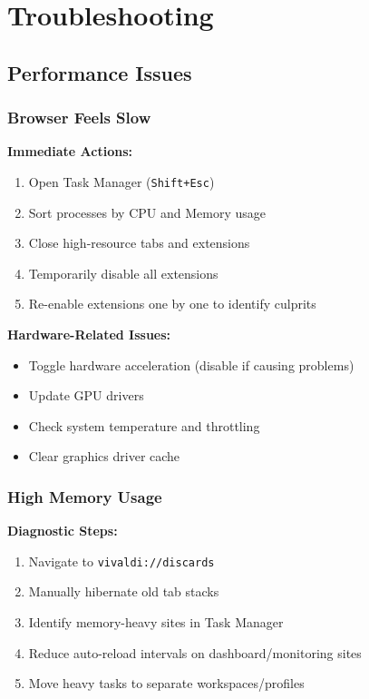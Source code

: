 \documentclass[11pt,a4paper,oneside]{book}
\newcommand{\keystroke}[1]{\texttt{\color{primaryblue}#1}}
\begin{document}
\chapter{Troubleshooting}

\section{Performance Issues}

\subsection{Browser Feels Slow}

\textbf{Immediate Actions:}
\begin{enumerate}
    \item Open Task Manager (\keystroke{Shift+Esc})
    \item Sort processes by CPU and Memory usage
    \item Close high-resource tabs and extensions
    \item Temporarily disable all extensions
    \item Re-enable extensions one by one to identify culprits
\end{enumerate}

\textbf{Hardware-Related Issues:}
\begin{itemize}
    \item Toggle hardware acceleration (disable if causing problems)
    \item Update GPU drivers
    \item Check system temperature and throttling
    \item Clear graphics driver cache
\end{itemize}

\subsection{High Memory Usage}

\textbf{Diagnostic Steps:}
\begin{enumerate}
    \item Navigate to \keystroke{vivaldi://discards}
    \item Manually hibernate old tab stacks
    \item Identify memory-heavy sites in Task Manager
    \item Reduce auto-reload intervals on dashboard/monitoring sites
    \item Move heavy tasks to separate workspaces/profiles
\end{enumerate}
\end{document}
